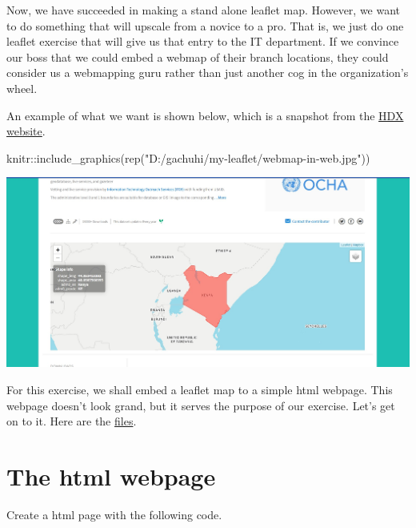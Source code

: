 \documentclass[
]{book}
\newenvironment{Shaded}{\begin{snugshade}}{\end{snugshade}}
\newcommand{\FunctionTok}[1]{\textcolor[rgb]{0.00,0.00,0.00}{#1}}
\newcommand{\NormalTok}[1]{#1}
\newcommand{\SpecialCharTok}[1]{\textcolor[rgb]{0.00,0.00,0.00}{#1}}
\newcommand{\StringTok}[1]{\textcolor[rgb]{0.31,0.60,0.02}{#1}}
\theoremstyle{definition}
\theoremstyle{definition}
\theoremstyle{definition}
\theoremstyle{definition}
\theoremstyle{remark}
\begin{document}
Now, we have succeeded in making a stand alone leaflet map. However, we want to do something that will upscale from a novice to a pro. That is, we just do one leaflet exercise that will give us that entry to the IT department. If we convince our boss that we could embed a webmap of their branch locations, they could consider us a webmapping guru rather than just another cog in the organization's wheel.

An example of what we want is shown below, which is a snapshot from the \href{https://data.humdata.org/dataset/cod-ab-ken}{HDX website}.

\begin{Shaded}
\begin{Highlighting}[]
\NormalTok{knitr}\SpecialCharTok{::}\FunctionTok{include\_graphics}\NormalTok{(}\FunctionTok{rep}\NormalTok{(}\StringTok{"D:/gachuhi/my{-}leaflet/webmap{-}in{-}web.jpg"}\NormalTok{))}
\end{Highlighting}
\end{Shaded}

\includegraphics[width=26.07in]{../webmap-in-web}

For this exercise, we shall embed a leaflet map to a simple html webpage. This webpage doesn't look grand, but it serves the purpose of our exercise. Let's get on to it. Here are the \href{https://www.dropbox.com/scl/fo/2u5xzr83z08rfxnlh8pc9/h?dl=0\&rlkey=zcrui1dsi7fzi3s5891yx9rty}{files}.

\hypertarget{the-html-webpage}{%
\section{The html webpage}\label{the-html-webpage}}

Create a html page with the following code.
\end{document}
